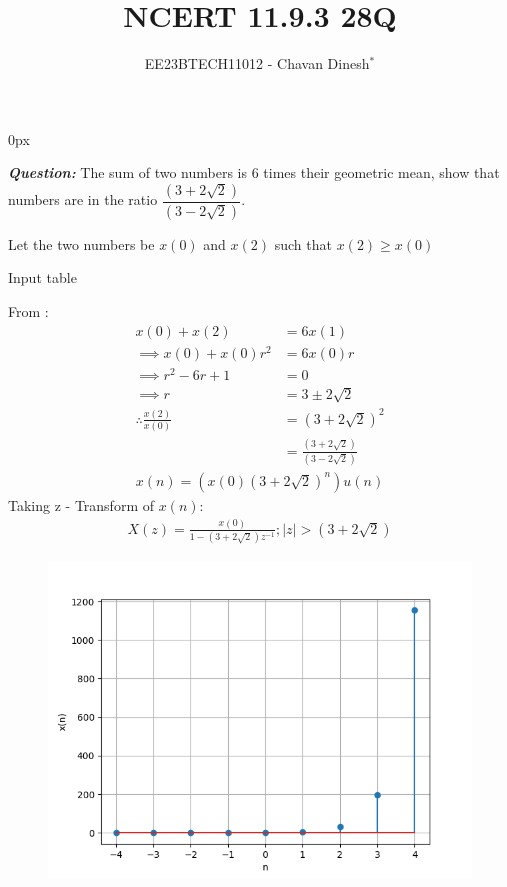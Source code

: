 \documentclass[journal,12pt,twocolumn]{IEEEtran}
\theoremstyle{remark}
\begin{document}
\parindent 0px

\vspace{3cm}

\title{NCERT 11.9.3 28Q}
\author{EE23BTECH11012 - Chavan Dinesh$^{*}$%
}
\maketitle
\newpage
\bigskip

\renewcommand{\thefigure}{\arabic{figure}}
\renewcommand{\thetable}{\arabic{table}}
\large\textbf{\textsl{Question:}}
The sum of two numbers is $6$ times their geometric mean, show that numbers are in the ratio $\dfrac{(3+2\sqrt{2})}{(3-2\sqrt{2})}$.

\solution
\fi
Let the two numbers be $x(0)$ and $x(2)$ such that $x(2)\geq x(0)$ 
\begin{table}[htbp]
    \centering
    
    \caption{Input table}
    \label{tab:parameter_table.11.9.3.28}
\end{table}

From :
\begin{align}
x(0) + x(2) &= 6x(1) \\
\implies x(0) + x(0)r^2 &= 6x(0)r \\
\implies r^2 - 6r +1 &= 0 \\
\implies r &= 3\pm 2\sqrt{2}\\
    \therefore \frac{x(2)}{x(0)} &= (3 + 2\sqrt{2})^2 \\
    &=  \frac{(3+2\sqrt{2})}{(3-2\sqrt{2})}
\end{align}
\begin{align}
x(n) = (x(0)(3 + 2\sqrt{2})^n)u(n)
\end{align}
Taking z - Transform of $x(n)$:
\begin{align}
    X(z) = \frac{x(0)}{1 - (3 + 2\sqrt{2})z^{-1}} ; |z| > (3 + 2\sqrt{2})
\end{align}
\begin{figure}[ht]
    \centering
    \includegraphics[width = \columnwidth]{ncert-maths/11/9/3/28/figs/x_n_stem_plot.png}
    \caption{}
    \label{fig:graph1.11.9.3.28}
\end{figure}
\end{document}
